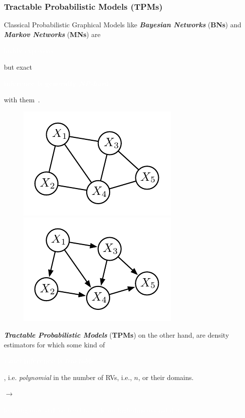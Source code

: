 \documentclass[xcolor={usenames,dvipsnames,svgnames}, compress]{beamer}
\newcommand{\highlighttext}[2][yellow]{{\colorbox{#1}{\strut\textcolor{white}{#2}}}}
\begin{document}
\begin{frame}[t]
  \frametitle{Tractable Probabilistic Models (TPMs)}

  \small
  Classical Probabilistic Graphical Models like \emph{\textbf{Bayesian Networks}}
    (\textbf{BNs}) and \emph{\textbf{Markov Networks}} (\textbf{MNs}) are \highlighttext[lacamlilac]{highly expressive} but
    exact \highlighttext[petroil2]{\textbf{inference is generally
        \emph{NP-hard}}} with them~\parencite{Roth1996}.

    \begin{figure}
      \centering
\includegraphics[width=0.3\linewidth]{figures/mrf} \hspace{30pt} \includegraphics[width=0.3\linewidth]{figures/bn}      
    \end{figure}
\vspace{-5pt}
    \emph{\textbf{Tractable Probabilistic Models} }  (\textbf{TPMs})
    on the other hand, are density estimators for which some kind of  \highlighttext[petroil2]{\textbf{\emph{exact}} \textbf{inference is}
    \textbf{\emph{tractable}}}, i.e. \emph{polynomial} in the number
  of RVs, i.e., $n$, or their
    domains.\par
    \hfill$\rightarrow$ \highlighttext[gold4]{learning may still be hard to scale on
    high-dimensional data}\\[20pt]

  
  \end{frame}
\end{document}
